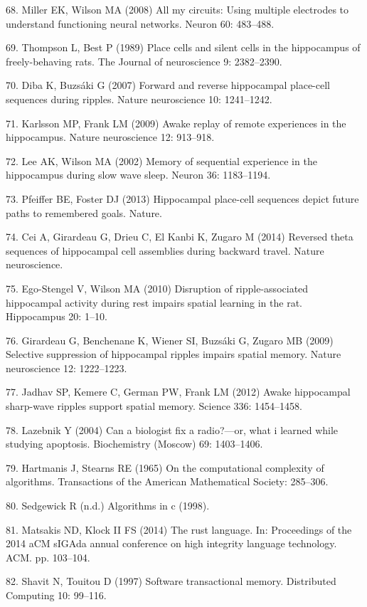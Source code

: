 \documentclass[]{article}
\begin{document}
68. Miller EK, Wilson MA (2008) All my circuits: Using multiple
electrodes to understand functioning neural networks. Neuron 60:
483--488.

69. Thompson L, Best P (1989) Place cells and silent cells in the
hippocampus of freely-behaving rats. The Journal of neuroscience 9:
2382--2390.

70. Diba K, Buzs{á}ki G (2007) Forward and reverse hippocampal
place-cell sequences during ripples. Nature neuroscience 10: 1241--1242.

71. Karlsson MP, Frank LM (2009) Awake replay of remote experiences in
the hippocampus. Nature neuroscience 12: 913--918.

72. Lee AK, Wilson MA (2002) Memory of sequential experience in the
hippocampus during slow wave sleep. Neuron 36: 1183--1194.

73. Pfeiffer BE, Foster DJ (2013) Hippocampal place-cell sequences
depict future paths to remembered goals. Nature.

74. Cei A, Girardeau G, Drieu C, El Kanbi K, Zugaro M (2014) Reversed
theta sequences of hippocampal cell assemblies during backward travel.
Nature neuroscience.

75. Ego-Stengel V, Wilson MA (2010) Disruption of ripple-associated
hippocampal activity during rest impairs spatial learning in the rat.
Hippocampus 20: 1--10.

76. Girardeau G, Benchenane K, Wiener SI, Buzs{á}ki G, Zugaro MB (2009)
Selective suppression of hippocampal ripples impairs spatial memory.
Nature neuroscience 12: 1222--1223.

77. Jadhav SP, Kemere C, German PW, Frank LM (2012) Awake hippocampal
sharp-wave ripples support spatial memory. Science 336: 1454--1458.

78. Lazebnik Y (2004) Can a biologist fix a radio?---or, what i learned
while studying apoptosis. Biochemistry (Moscow) 69: 1403--1406.

79. Hartmanis J, Stearns RE (1965) On the computational complexity of
algorithms. Transactions of the American Mathematical Society: 285--306.

80. Sedgewick R (n.d.) Algorithms in c (1998).

81. Matsakis ND, Klock II FS (2014) The rust language. In: Proceedings
of the 2014 aCM sIGAda annual conference on high integrity language
technology. ACM. pp. 103--104.

82. Shavit N, Touitou D (1997) Software transactional memory.
Distributed Computing 10: 99--116.
\end{document}
